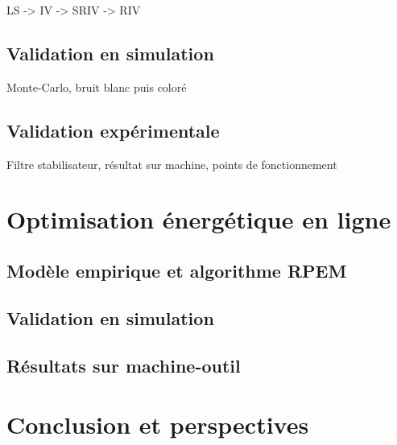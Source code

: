 \documentclass{style/presentation}
\begin{document}
\begin{frame}
    LS -> IV -> SRIV -> RIV
\end{frame}

\subsection{Validation en simulation}

\begin{frame}
    Monte-Carlo, bruit blanc puis coloré
\end{frame}

\subsection{Validation expérimentale}

\begin{frame}
    Filtre stabilisateur, résultat sur machine, points de fonctionnement
\end{frame}

\section{Optimisation énergétique en ligne}

\subsection{Modèle empirique et algorithme RPEM}

\begin{frame}

\end{frame}

\subsection{Validation en simulation}

\begin{frame}

\end{frame}

\subsection{Résultats sur machine-outil}

\begin{frame}

\end{frame}

\section{Conclusion et perspectives}

\begin{frame}

\end{frame}
\end{document}
